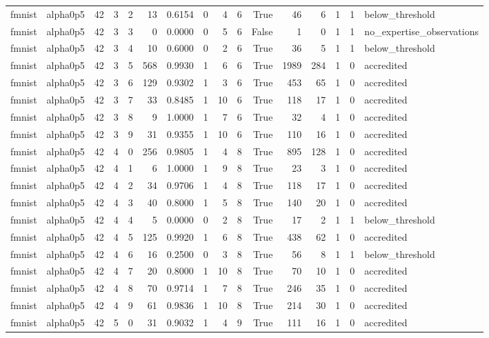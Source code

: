 \begin{tabular}{llrrrrrrrrrrrrrl}
fmnist & alpha0p5 & 42 & 3 & 2 & 13 & 0.6154 & 0 & 4 & 6 & True & 46 & 6 & 1 & 1 & below\_threshold \\
fmnist & alpha0p5 & 42 & 3 & 3 & 0 & 0.0000 & 0 & 5 & 6 & False & 1 & 0 & 1 & 1 & no\_expertise\_observations \\
fmnist & alpha0p5 & 42 & 3 & 4 & 10 & 0.6000 & 0 & 2 & 6 & True & 36 & 5 & 1 & 1 & below\_threshold \\
fmnist & alpha0p5 & 42 & 3 & 5 & 568 & 0.9930 & 1 & 6 & 6 & True & 1989 & 284 & 1 & 0 & accredited \\
fmnist & alpha0p5 & 42 & 3 & 6 & 129 & 0.9302 & 1 & 3 & 6 & True & 453 & 65 & 1 & 0 & accredited \\
fmnist & alpha0p5 & 42 & 3 & 7 & 33 & 0.8485 & 1 & 10 & 6 & True & 118 & 17 & 1 & 0 & accredited \\
fmnist & alpha0p5 & 42 & 3 & 8 & 9 & 1.0000 & 1 & 7 & 6 & True & 32 & 4 & 1 & 0 & accredited \\
fmnist & alpha0p5 & 42 & 3 & 9 & 31 & 0.9355 & 1 & 10 & 6 & True & 110 & 16 & 1 & 0 & accredited \\
fmnist & alpha0p5 & 42 & 4 & 0 & 256 & 0.9805 & 1 & 4 & 8 & True & 895 & 128 & 1 & 0 & accredited \\
fmnist & alpha0p5 & 42 & 4 & 1 & 6 & 1.0000 & 1 & 9 & 8 & True & 23 & 3 & 1 & 0 & accredited \\
fmnist & alpha0p5 & 42 & 4 & 2 & 34 & 0.9706 & 1 & 4 & 8 & True & 118 & 17 & 1 & 0 & accredited \\
fmnist & alpha0p5 & 42 & 4 & 3 & 40 & 0.8000 & 1 & 5 & 8 & True & 140 & 20 & 1 & 0 & accredited \\
fmnist & alpha0p5 & 42 & 4 & 4 & 5 & 0.0000 & 0 & 2 & 8 & True & 17 & 2 & 1 & 1 & below\_threshold \\
fmnist & alpha0p5 & 42 & 4 & 5 & 125 & 0.9920 & 1 & 6 & 8 & True & 438 & 62 & 1 & 0 & accredited \\
fmnist & alpha0p5 & 42 & 4 & 6 & 16 & 0.2500 & 0 & 3 & 8 & True & 56 & 8 & 1 & 1 & below\_threshold \\
fmnist & alpha0p5 & 42 & 4 & 7 & 20 & 0.8000 & 1 & 10 & 8 & True & 70 & 10 & 1 & 0 & accredited \\
fmnist & alpha0p5 & 42 & 4 & 8 & 70 & 0.9714 & 1 & 7 & 8 & True & 246 & 35 & 1 & 0 & accredited \\
fmnist & alpha0p5 & 42 & 4 & 9 & 61 & 0.9836 & 1 & 10 & 8 & True & 214 & 30 & 1 & 0 & accredited \\
fmnist & alpha0p5 & 42 & 5 & 0 & 31 & 0.9032 & 1 & 4 & 9 & True & 111 & 16 & 1 & 0 & accredited \\

\end{tabular}
